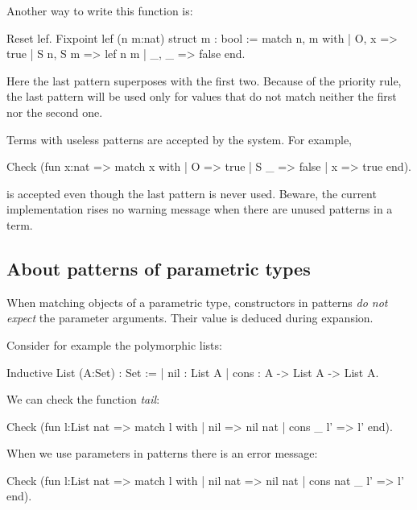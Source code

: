 Another way to write  this function is:

\begin{coq_example}
Reset lef.
Fixpoint lef (n m:nat) {struct m} : bool :=
  match n, m with
  | O, x => true
  | S n, S m => lef n m
  | _, _ => false
  end.
\end{coq_example}


Here the last pattern superposes with the first two. Because
of the priority rule, the last pattern 
will be used only for values that do not match neither the  first nor
the second one.  

Terms with useless patterns are accepted by the
system. For example,
\begin{coq_example}
Check
  (fun x:nat => match x with
                | O => true
                | S _ => false
                | x => true
                end).
\end{coq_example}

is accepted even though the last pattern is never used.
Beware,  the
current implementation rises no warning message when there are unused
patterns in a term.




\subsection{About patterns of parametric types}
When matching objects of a parametric type, constructors in patterns
{\em do not expect} the parameter arguments. Their value is deduced
during expansion.

Consider for example the polymorphic lists:

\begin{coq_example}
Inductive List (A:Set) : Set :=
  | nil : List A
  | cons : A -> List A -> List A.
\end{coq_example}

We can check the function {\em tail}:

\begin{coq_example}
Check
  (fun l:List nat =>
     match l with
     | nil => nil nat
     | cons _ l' => l'
     end).
\end{coq_example}


When we use parameters in patterns there is an error message:
\begin{coq_example}
Check
  (fun l:List nat =>
     match l with
     | nil nat => nil nat
     | cons nat _ l' => l'
     end).
\end{coq_example}



